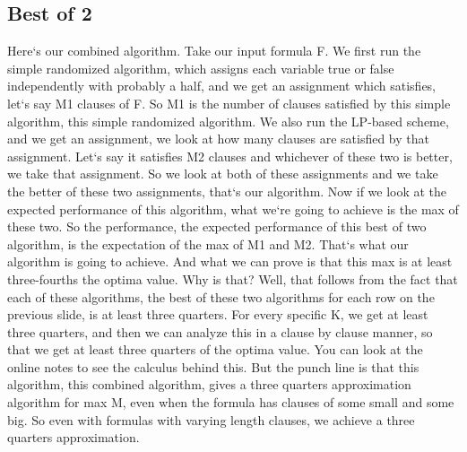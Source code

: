 \subsection{Best of 2}
Here`s our combined algorithm.
Take our input formula F\@.
We first run the simple randomized algorithm, which assigns each variable true or false independently with probably a half, and we get an assignment which satisfies, let`s say M1 clauses of F\@.
So M1 is the number of clauses satisfied by this simple algorithm, this simple randomized algorithm.
We also run the LP-based scheme, and we get an assignment, we look at how many clauses are satisfied by that assignment.
Let`s say it satisfies M2 clauses and whichever of these two is better, we take that assignment.
So we look at both of these assignments and we take the better of these two assignments, that`s our algorithm.
Now if we look at the expected performance of this algorithm, what we`re going to achieve is the max of these two.
So the performance, the expected performance of this best of two algorithm, is the expectation of the max of M1 and M2.
That`s what our algorithm is going to achieve.
And what we can prove is that this max is at least three-fourths the optima value.
Why is that? Well, that follows from the fact that each of these algorithms, the best of these two algorithms for each row on the previous slide, is at least three quarters.
For every specific K, we get at least three quarters, and then we can analyze this in a clause by clause manner, so that we get at least three quarters of the optima value.
You can look at the online notes to see the calculus behind this.
But the punch line is that this algorithm, this combined algorithm, gives a three quarters approximation algorithm for max M, even when the formula has clauses of some small and some big.
So even with formulas with varying length clauses, we achieve a three quarters approximation.

